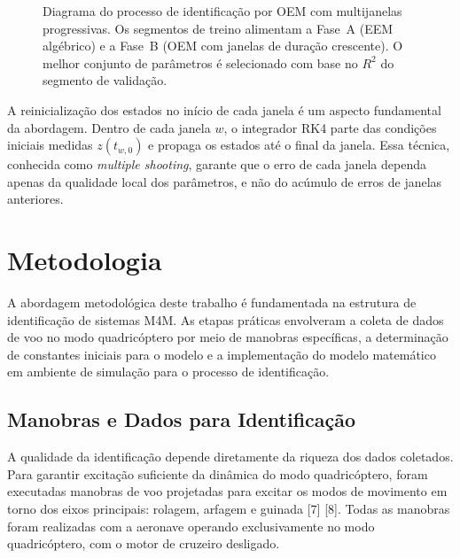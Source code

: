 \documentclass[letterpaper, 10 pt, conference]{ieeeconf}
\begin{document}
\begin{figure}[htbp]
{%
}
\caption{Diagrama do processo de identifica\c{c}\~ao por OEM com multijanelas progressivas. Os segmentos de treino alimentam a Fase~A (EEM alg\'ebrico) e a Fase~B (OEM com janelas de dura\c{c}\~ao crescente). O melhor conjunto de par\^ametros \'e selecionado com base no $R^2$ do segmento de valida\c{c}\~ao.}
\label{fig:oem_diagram}
\end{figure}

A reinicialização dos estados no início de cada janela é um aspecto fundamental da abordagem. Dentro de cada janela $w$, o integrador RK4 parte das condições iniciais medidas $z(t_{w,0})$ e propaga os estados até o final da janela. Essa técnica, conhecida como \textit{multiple shooting}, garante que o erro de cada janela dependa apenas da qualidade local dos parâmetros, e não do acúmulo de erros de janelas anteriores.

\section{Metodologia}

A abordagem metodológica deste trabalho é fundamentada na estrutura de identificação de sistemas M4M. As etapas práticas envolveram a coleta de dados de voo no modo quadricóptero por meio de manobras específicas, a determinação de constantes iniciais para o modelo e a implementação do modelo matemático em ambiente de simulação para o processo de identificação.

\subsection{Manobras e Dados para Identificação}

A qualidade da identificação depende diretamente da riqueza dos dados coletados. Para garantir excitação suficiente da dinâmica do modo quadricóptero, foram executadas manobras de voo projetadas para excitar os modos de movimento em torno dos eixos principais: rolagem, arfagem e guinada [7] [8]. Todas as manobras foram realizadas com a aeronave operando exclusivamente no modo quadricóptero, com o motor de cruzeiro desligado.
\end{document}
